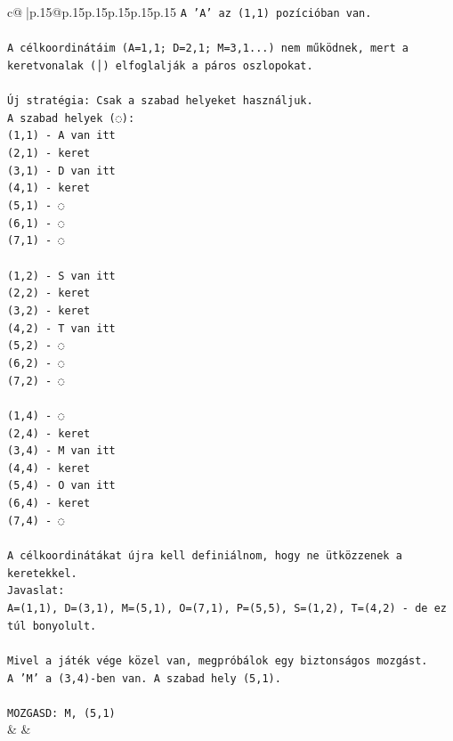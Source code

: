 \documentclass{article}
\begin{document}
{\begin{supertabular}{c@{$\;$}|p{.15\linewidth}@{}p{.15\linewidth}p{.15\linewidth}p{.15\linewidth}p{.15\linewidth}p{.15\linewidth}}
{{{\texttt{A 'A' az (1,1) pozícióban van.} \\
\\ 
\texttt{A célkoordinátáim (A=1,1; D=2,1; M=3,1...) nem működnek, mert a keretvonalak (│) elfoglalják a páros oszlopokat.} \\
\\ 
\texttt{Új stratégia: Csak a szabad helyeket használjuk.} \\
\texttt{A szabad helyek (◌):} \\
\texttt{(1,1) {-} A van itt} \\
\texttt{(2,1) {-} keret} \\
\texttt{(3,1) {-} D van itt} \\
\texttt{(4,1) {-} keret} \\
\texttt{(5,1) {-} ◌} \\
\texttt{(6,1) {-} ◌} \\
\texttt{(7,1) {-} ◌} \\
\\ 
\texttt{(1,2) {-} S van itt} \\
\texttt{(2,2) {-} keret} \\
\texttt{(3,2) {-} keret} \\
\texttt{(4,2) {-} T van itt} \\
\texttt{(5,2) {-} ◌} \\
\texttt{(6,2) {-} ◌} \\
\texttt{(7,2) {-} ◌} \\
\\ 
\texttt{(1,4) {-} ◌} \\
\texttt{(2,4) {-} keret} \\
\texttt{(3,4) {-} M van itt} \\
\texttt{(4,4) {-} keret} \\
\texttt{(5,4) {-} O van itt} \\
\texttt{(6,4) {-} keret} \\
\texttt{(7,4) {-} ◌} \\
\\ 
\texttt{A célkoordinátákat újra kell definiálnom, hogy ne ütközzenek a keretekkel.} \\
\texttt{Javaslat:} \\
\texttt{A=(1,1), D=(3,1), M=(5,1), O=(7,1), P=(5,5), S=(1,2), T=(4,2) {-} de ez túl bonyolult.} \\
\\ 
\texttt{Mivel a játék vége közel van, megpróbálok egy biztonságos mozgást.} \\
\texttt{A 'M' a (3,4){-}ben van. A szabad hely (5,1).} \\
\\ 
\texttt{MOZGASD: M, (5,1)} \\
            }
        }
    }
    & & \\ \\


\end{supertabular}}
\end{document}
